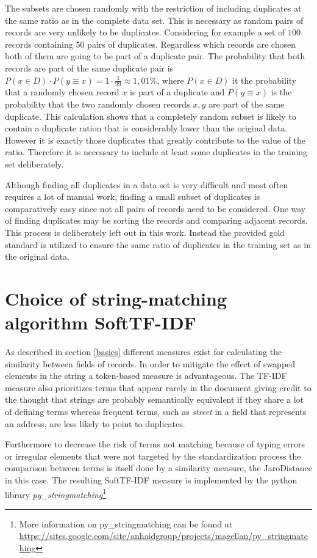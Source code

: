 \documentclass[conference]{IEEEtran}
\begin{document}
The subsets are chosen randomly with the restriction of including duplicates at the same ratio as in the complete data set. This is necessary as random pairs of records are very unlikely to be duplicates. Considering for example a set of $100$ records containing $50$ pairs of duplicates. Regardless which records are chosen both of them are going to be part of a duplicate pair. The probability that both records are part of the same duplicate pair is $P(x \in D) \cdot P(y \equiv x) = 1 \cdot \frac{1}{99} \approx 1,01\%$, where $P(x \in D)$ it the probability that a randomly chosen record $x$ is part of a duplicate and $P(y \equiv x)$ is the probability that the two randomly chosen records $x,y$ are part of the same duplicate. This calculation shows that a completely random subset is likely to contain a duplicate ration that is considerably lower than the original data. However it is exactly those duplicates that greatly contribute to the value of the ratio.
Therefore it is necessary to include at least some duplicates in the training set deliberately.

Although finding all duplicates in a data set is very difficult and most often requires a lot of manual work, finding a small subset of duplicates is comparatively easy since not all pairs of records need to be considered. One way of finding duplicates may be sorting the records and comparing adjacent records. This process is deliberately left out in this work. Instead the provided gold standard is utilized to ensure the same ratio of duplicates in the training set as in the original data.
\section{Choice of string-matching algorithm SoftTF-IDF}\label{matching}
As described in section \ref{basics} different measures exist for calculating the similarity between fields of records. In order to mitigate the effect of swapped elements in the string a token-based measure is advantageous. The TF-IDF measure also prioritizes terms that appear rarely in the document giving credit to the thought that strings are probably semantically equivalent if they share a lot of defining terms whereas frequent terms, such as \emph{street} in a field that represents an address, are less likely to point to duplicates\cite{Cohen.1998}.

Furthermore to decrease the risk of terms not matching because of typing errors or irregular elements that were not targeted by the standardization process the comparison between terms is itself done by a similarity measure, the JaroDistance in this case. The resulting SoftTF-IDF measure is implemented by the python library \emph{py\_stringmatching}\footnote{More information on py\_stringmatching  can be found at \url{https://sites.google.com/site/anhaidgroup/projects/magellan/py\_stringmatching}}
\end{document}

